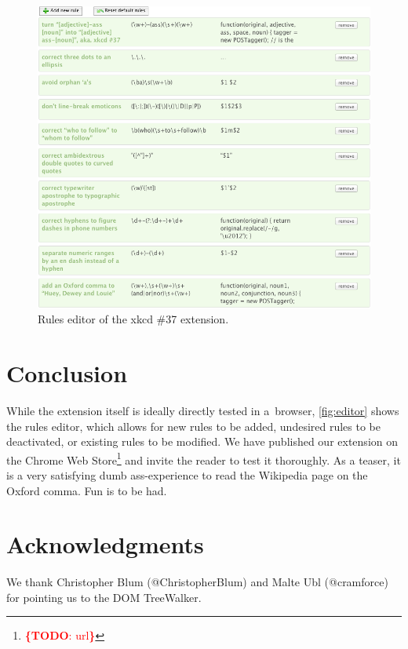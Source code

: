 \documentclass{acm_proc_article-sp}
\newcommand{\todo}[1]{\noindent\textcolor{red}{{\bf \{TODO}: #1{\bf \}}}}
\newcommand{\inlinelistingsize}{\fontsize{8pt}{11pt}}
\let\oldttdefault\ttdefault
\renewcommand{\ttdefault}{pcr}
\let\oldurl\url
\renewcommand{\url}[1]{\inlinelistingsize\oldurl{#1}}
\begin{document}
\begin{figure}[h!]
\vspace{+10pt}
\begin{center}
   \includegraphics[width=1\linewidth]{./editor.png}
\end{center}
   \caption{Rules editor of the xkcd \#37 extension.}
\label{fig:editor}
\end{figure}

\section{Conclusion}
While the extension itself is ideally directly tested in a~browser, \autoref{fig:editor} shows the rules editor,
which allows for new rules to be added, undesired rules to be deactivated, or existing rules to be modified.
We have published our extension on the Chrome Web Store\footnote{\todo{url}} and invite the reader to test it thoroughly.
As a teaser, it is a very satisfying dumb ass-experience to read the Wikipedia page on the Oxford comma.
Fun is to be had.

\section{Acknowledgments}
We thank Christopher Blum (@ChristopherBlum) and Malte Ubl (@cramforce) for pointing us to the DOM TreeWalker.

\let\ttdefault\oldttdefault
\let\url\oldurl




\balancecolumns
\end{document}
